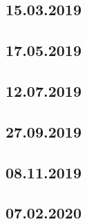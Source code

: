 \documentclass[a4paper,12p]{article}
\begin{document}
	\newpage
	\subsection{15.03.2019} %
		
	
	
	\newpage	
	\subsection{17.05.2019}
	
	
	\newpage
	\subsection{12.07.2019}
	
	
	
	
	
	\newpage
	\subsection{27.09.2019}
	\subsection{08.11.2019}
	\subsection{07.02.2020}
\end{document}
